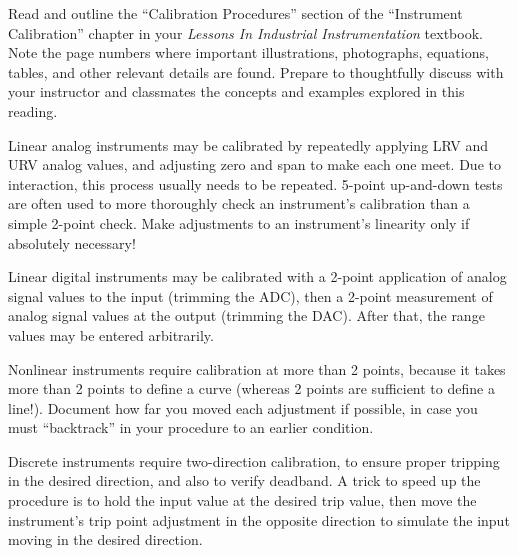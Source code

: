 

Read and outline the ``Calibration Procedures'' section of the ``Instrument Calibration'' chapter in your {\it Lessons In Industrial Instrumentation} textbook.  Note the page numbers where important illustrations, photographs, equations, tables, and other relevant details are found.  Prepare to thoughtfully discuss with your instructor and classmates the concepts and examples explored in this reading.














Linear analog instruments may be calibrated by repeatedly applying LRV and URV analog values, and adjusting zero and span to make each one meet.  Due to interaction, this process usually needs to be repeated.  5-point up-and-down tests are often used to more thoroughly check an instrument's calibration than a simple 2-point check.  Make adjustments to an instrument's linearity only if absolutely necessary!

\vskip 10pt

Linear digital instruments may be calibrated with a 2-point application of analog signal values to the input (trimming the ADC), then a 2-point measurement of analog signal values at the output (trimming the DAC).  After that, the range values may be entered arbitrarily.

\vskip 10pt

Nonlinear instruments require calibration at more than 2 points, because it takes more than 2 points to define a curve (whereas 2 points are sufficient to define a line!).  Document how far you moved each adjustment if possible, in case you must ``backtrack'' in your procedure to an earlier condition.

\vskip 10pt

Discrete instruments require two-direction calibration, to ensure proper tripping in the desired direction, and also to verify deadband.  A trick to speed up the procedure is to hold the input value at the desired trip value, then move the instrument's trip point adjustment in the opposite direction to simulate the input moving in the desired direction.









